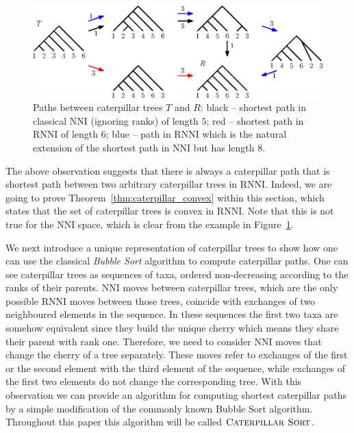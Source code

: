 \documentclass{amsart}
\newcommand{\nni}{\mathrm{NNI}}
\newcommand{\rnni}{\mathrm{RNNI}}
\newcommand{\csort}{\textsc{Caterpillar Sort}}
\begin{document}
\begin{figure}[H]
	\centering
	\includegraphics[width=\textwidth]{NNI_vs_RNNI}
	\caption{Paths between caterpillar trees $T$ and $R$: black -- shortest path in classical $\nni$ (ignoring ranks) of length $5$; red -- shortest path in $\rnni$ of length $6$; blue -- path in $\rnni$ which is the natural extension of the shortest path in $\nni$ but has length $8$.}
	\label{fig:NNI_vs_RNNI}
\end{figure}

The above observation suggests that there is always a caterpillar path that is shortest path between two arbitrary caterpillar trees in $\rnni$.
Indeed, we are going to prove Theorem~\ref{thm:caterpillar_convex} within this section, which states that the set of caterpillar trees is convex in $\rnni$.
Note that this is not true for the $\nni$ space, which is clear from the example in Figure~\ref{fig:NNI_vs_RNNI}.

We next introduce a unique representation of caterpillar trees to show how one can use the classical \emph{Bubble Sort} algorithm \autocite{Knuth1997-pi} to compute caterpillar paths.
One can see caterpillar trees as sequences of taxa, ordered non-decreasing according to the ranks of their parents.
$\nni$ moves between caterpillar trees, which are the only possible $\rnni$ moves between those trees, coincide with exchanges of two neighboured elements in the sequence.
In these sequences the first two taxa are somehow equivalent since they build the unique cherry which means they share their parent with rank one.
Therefore, we need to consider $\nni$ moves that change the cherry of a tree separately.
These moves refer to exchanges of the first or the second element with the third element of the sequence, while exchanges of the first two elements do not change the corresponding tree.
With this observation we can provide an algorithm for computing shortest caterpillar paths by a simple modification of the commonly known Bubble Sort algorithm.
Throughout this paper this algorithm will be called $\csort$.
\end{document}
